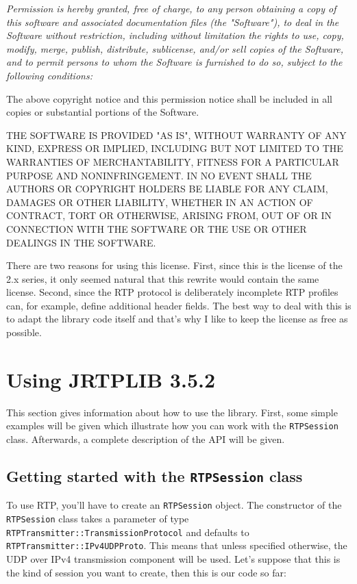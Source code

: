 \documentclass[12pt,a4paper]{article}
\newcommand{\jversion}{3.5.2}
\begin{document}
			{\em Permission is hereby granted, free of charge, to any person
			obtaining a copy of this software and associated documentation files
			(the "Software"), to deal in the Software without restriction,
			including without limitation the rights to use, copy, modify, merge,
			publish, distribute, sublicense, and/or sell copies of the Software,
			and to permit persons to whom the Software is furnished to do so,
			subject to the following conditions:

			The above copyright notice and this permission notice shall be
			included in all copies or substantial portions of the Software.

			THE SOFTWARE IS PROVIDED "AS IS", WITHOUT WARRANTY OF ANY
			KIND, EXPRESS OR IMPLIED, INCLUDING BUT NOT LIMITED TO THE
			WARRANTIES OF MERCHANTABILITY, FITNESS FOR A PARTICULAR PURPOSE AND
			NONINFRINGEMENT. IN NO EVENT SHALL THE AUTHORS OR COPYRIGHT HOLDERS
			BE LIABLE FOR ANY CLAIM, DAMAGES OR OTHER LIABILITY, WHETHER IN AN
			ACTION OF CONTRACT, TORT OR OTHERWISE, ARISING FROM, OUT OF OR IN
			CONNECTION WITH THE SOFTWARE OR THE USE OR OTHER DEALINGS IN THE
			SOFTWARE.}

		There are two reasons for using this license. First, since this is the
		license of the 2.x series, it only seemed natural that this rewrite
		would contain the same license. Second, since the RTP protocol is
		deliberately incomplete RTP profiles can, for example, define additional
		header fields. The best way to deal with this is to adapt the library
		code itself and that's why I like to keep the license as free as
		possible.

	\section{Using JRTPLIB \jversion}
		
		This section gives information about how to use the library. First, some
		simple examples will be given which illustrate how you can work with the
		{\tt RTPSession} class. Afterwards, a complete description of the API
		will be given.

		\subsection{Getting started with the {\tt RTPSession} class}

			To use RTP, you'll have to create an {\tt RTPSession} object. The
			constructor of the {\tt RTPSession} class takes a parameter of
			type {\tt RTPTrans\-mitter::Trans\-mission\-Protocol} and defaults
			to {\tt RTPTrans\-mitter::IPv4UDPProto}. This means that unless
			specified otherwise, the UDP over IPv4 transmission component will
			be used. Let's suppose that this is the kind of session you want to
			create, then this is our code so far:
\end{document}
